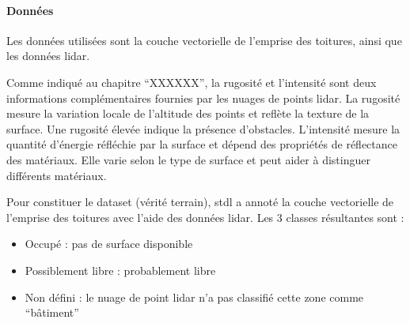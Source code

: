 {{\paragraph{Données}
\par{Les données utilisées sont la couche vectorielle de l'emprise des toitures, ainsi que les données \gls{lidar}.}
\par{Comme indiqué au chapitre ``XXXXXX'', la rugosité et l'intensité sont deux informations complémentaires fournies par les nuages de points \gls{lidar}. La rugosité mesure la variation locale de l'altitude des points et reflète la texture de la surface. Une rugosité élevée indique la présence d'obstacles. L'intensité mesure la quantité d'énergie réfléchie par la surface et dépend des propriétés de réflectance des matériaux. Elle varie selon le type de surface et peut aider à distinguer différents matériaux.}
\par{Pour constituer le dataset (vérité terrain), \acrshort{stdl} a annoté la couche vectorielle de l'emprise des toitures avec l'aide des données \gls{lidar}. Les 3 classes résultantes sont :}
\begin{itemize}
    \item Occupé : pas de surface disponible
    \item Possiblement libre : probablement libre
    \item Non défini : le nuage de point \gls{lidar} n'a pas classifié cette zone comme ``bâtiment''
\end{itemize}

}}
